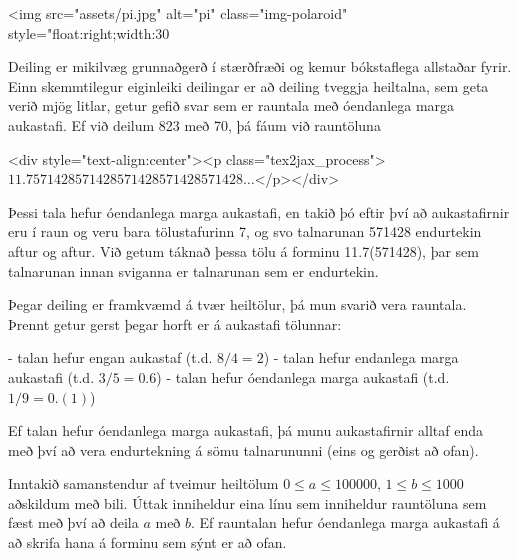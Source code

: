 
<img src="assets/pi.jpg" alt="pi" class="img-polaroid" style="float:right;width:30%

Deiling er mikilvæg grunnaðgerð í stærðfræði og kemur bókstaflega allstaðar
fyrir. Einn skemmtilegur eiginleiki deilingar er að deiling tveggja heiltalna,
sem geta verið mjög litlar, getur gefið svar sem er rauntala með óendanlega
marga aukastafi. Ef við deilum 823 með 70, þá fáum við rauntöluna

<div style="text-align:center"><p class="tex2jax_process">$11.7571428571428571428571428571428\ldots$</p></div>

Þessi tala hefur óendanlega marga aukastafi, en takið þó eftir því að aukastafirnir
eru í raun og veru bara tölustafurinn 7, og svo talnarunan 571428 endurtekin
aftur og aftur. Við getum táknað þessa tölu á forminu 11.7(571428), þar sem
talnarunan innan sviganna er talnarunan sem er endurtekin.

Þegar deiling er framkvæmd á tvær heiltölur, þá mun svarið vera rauntala.
Þrennt getur gerst þegar horft er á aukastafi tölunnar:

- talan hefur engan aukastaf (t.d. $8/4 = 2$)
- talan hefur endanlega marga aukastafi (t.d. $3/5 = 0.6$)
- talan hefur óendanlega marga aukastafi (t.d. $1/9 = 0.(1)$)

Ef talan hefur óendanlega marga aukastafi, þá munu aukastafirnir alltaf enda
með því að vera endurtekning á sömu talnarununni (eins og gerðist að ofan).

Inntakið samanstendur af tveimur heiltölum $0 \leq a \leq 100000$, $1 \leq b \leq 1000$ aðskildum með bili. Úttak
inniheldur eina línu sem inniheldur rauntöluna sem fæst með því að deila $a$ með
$b$. Ef rauntalan hefur óendanlega marga aukastafi á að skrifa hana á forminu sem
sýnt er að ofan.
